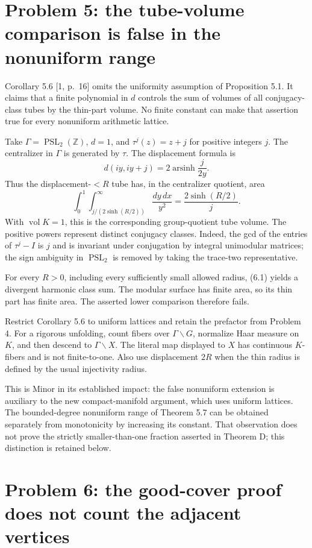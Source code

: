 \documentclass[10pt]{article}
\begin{document}
\section*{Problem 5: the tube-volume comparison is false in the nonuniform range}
Corollary 5.6 [1, p. 16] omits the uniformity assumption of Proposition 5.1. It claims that a finite polynomial in \(d\) controls the sum of volumes of all conjugacy-class tubes by the thin-part volume. No finite constant can make that assertion true for every nonuniform arithmetic lattice.\par
Take \(\Gamma=\operatorname{PSL}_2(\mathbb Z)\), \(d=1\), and \(\tau^j(z)=z+j\) for positive integers \(j\). The centralizer in \(\Gamma\) is generated by \(\tau\). The displacement formula is \[d(iy,iy+j)=2\operatorname{arsinh}\frac{j}{2y}.\] Thus the displacement-\(<R\) tube has, in the centralizer quotient, area \[\int_0^1\int_{j/(2\sinh(R/2))}^{\infty}\frac{dy\,dx}{y^2}
 =\frac{2\sinh(R/2)}{j}.
 \tag{6.1}\] With \(\operatorname{vol}K=1\), this is the corresponding group-quotient tube volume. The positive powers represent distinct conjugacy classes. Indeed, the gcd of the entries of \(\tau^j-I\) is \(j\) and is invariant under conjugation by integral unimodular matrices; the sign ambiguity in \(\operatorname{PSL}_2\) is removed by taking the trace-two representative.\par
For every \(R>0\), including every sufficiently small allowed radius, (6.1) yields a divergent harmonic class sum. The modular surface has finite area, so its thin part has finite area. The asserted lower comparison therefore fails.\par
Restrict Corollary 5.6 to uniform lattices and retain the prefactor from Problem 4. For a rigorous unfolding, count fibers over \(\Gamma\backslash G\), normalize Haar measure on \(K\), and then descend to \(\Gamma\backslash X\). The literal map displayed to \(X\) has continuous \(K\)-fibers and is not finite-to-one. Also use displacement \(2R\) when the thin radius is defined by the usual injectivity radius.\par
This is Minor in its established impact: the false nonuniform extension is auxiliary to the new compact-manifold argument, which uses uniform lattices. The bounded-degree nonuniform range of Theorem 5.7 can be obtained separately from monotonicity by increasing its constant. That observation does not prove the strictly smaller-than-one fraction asserted in Theorem D; this distinction is retained below.\par
\section*{Problem 6: the good-cover proof does not count the adjacent vertices}
\end{document}
